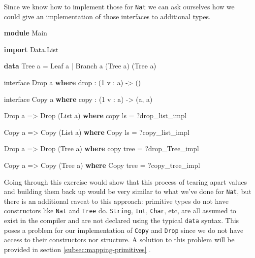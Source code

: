 \documentclass[
]{article}
\newenvironment{Shaded}{}{}
\newcommand{\DataTypeTok}[1]{\textcolor[rgb]{0.56,0.13,0.00}{#1}}
\newcommand{\DecValTok}[1]{\textcolor[rgb]{0.25,0.63,0.44}{#1}}
\newcommand{\FunctionTok}[1]{\textcolor[rgb]{0.02,0.16,0.49}{#1}}
\newcommand{\KeywordTok}[1]{\textcolor[rgb]{0.00,0.44,0.13}{\textbf{#1}}}
\newcommand{\NormalTok}[1]{#1}
\newcommand{\OperatorTok}[1]{\textcolor[rgb]{0.40,0.40,0.40}{#1}}
\newcommand{\OtherTok}[1]{\textcolor[rgb]{0.00,0.44,0.13}{#1}}
\begin{document}
Since we know how to implement those for \texttt{Nat} we can ask
ourselves how we could give an implementation of those interfaces to
additional types.

\begin{Shaded}
\begin{Highlighting}[]
\KeywordTok{module} \DataTypeTok{Main}

\KeywordTok{import} \DataTypeTok{Data.List}

\KeywordTok{data} \DataTypeTok{Tree}\NormalTok{ a }\OtherTok{=} \DataTypeTok{Leaf}\NormalTok{ a }\OperatorTok{|} \DataTypeTok{Branch}\NormalTok{ a (}\DataTypeTok{Tree}\NormalTok{ a) (}\DataTypeTok{Tree}\NormalTok{ a)}

\NormalTok{interface }\DataTypeTok{Drop}\NormalTok{ a }\KeywordTok{where}
    \FunctionTok{drop} \OperatorTok{:}\NormalTok{ (}\DecValTok{1}\NormalTok{ v }\OperatorTok{:}\NormalTok{ a) }\OtherTok{{-}\textgreater{}}\NormalTok{ ()}

\NormalTok{interface }\DataTypeTok{Copy}\NormalTok{ a }\KeywordTok{where}
\NormalTok{    copy }\OperatorTok{:}\NormalTok{ (}\DecValTok{1}\NormalTok{ v }\OperatorTok{:}\NormalTok{ a) }\OtherTok{{-}\textgreater{}}\NormalTok{ (a, a)}

\DataTypeTok{Drop}\NormalTok{ a }\OtherTok{=\textgreater{}} \DataTypeTok{Drop}\NormalTok{ (}\DataTypeTok{List}\NormalTok{ a) }\KeywordTok{where}
\NormalTok{    copy ls }\OtherTok{=} \OperatorTok{?}\NormalTok{drop\_list\_impl}

\DataTypeTok{Copy}\NormalTok{ a }\OtherTok{=\textgreater{}} \DataTypeTok{Copy}\NormalTok{ (}\DataTypeTok{List}\NormalTok{ a) }\KeywordTok{where}
    \DataTypeTok{Copy}\NormalTok{ ls }\OtherTok{=} \OperatorTok{?}\NormalTok{copy\_list\_impl}

\DataTypeTok{Drop}\NormalTok{ a }\OtherTok{=\textgreater{}} \DataTypeTok{Drop}\NormalTok{ (}\DataTypeTok{Tree}\NormalTok{ a) }\KeywordTok{where}
\NormalTok{    copy tree }\OtherTok{=} \OperatorTok{?}\NormalTok{drop\_Tree\_impl}

\DataTypeTok{Copy}\NormalTok{ a }\OtherTok{=\textgreater{}} \DataTypeTok{Copy}\NormalTok{ (}\DataTypeTok{Tree}\NormalTok{ a) }\KeywordTok{where}
    \DataTypeTok{Copy}\NormalTok{ tree }\OtherTok{=} \OperatorTok{?}\NormalTok{copy\_tree\_impl}
\end{Highlighting}
\end{Shaded}

Going through this exercise would show that this process of tearing
apart values and building them back up would be very similar to what
we've done for \texttt{Nat}, but there is an additional caveat to this
approach: primitive types do not have constructors like \texttt{Nat} and
\texttt{Tree} do. \texttt{String}, \texttt{Int}, \texttt{Char}, etc, are
all assumed to exist in the compiler and are not declared using the
typical \texttt{data} syntax. This poses a problem for our
implementation of \texttt{Copy} and \texttt{Drop} since we do not have
access to their constructors nor structure. A solution to this problem
will be provided in section \ref{subsec:mapping-primitives} .
\end{document}
